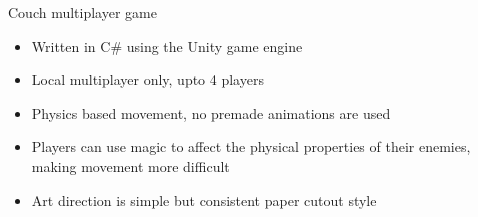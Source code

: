 \item Couch multiplayer game
\begin{itemize}
    \item Written in C\# using the Unity game engine
    \item Local multiplayer only, upto 4 players
    \item Physics based movement, no premade animations are used
    \item Players can use magic to affect the physical properties of their enemies, making movement more difficult
    \item Art direction is simple but consistent paper cutout style
\end{itemize}
